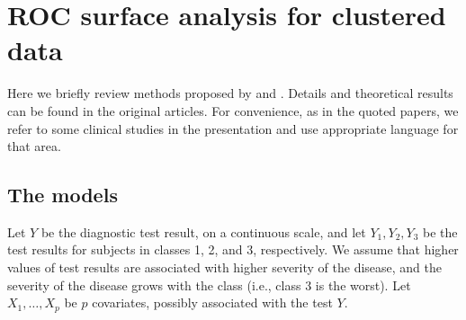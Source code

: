 \hypertarget{roc-surface-analysis-for-clustered-data}{%
\section{ROC surface analysis for clustered
data}\label{roc-surface-analysis-for-clustered-data}}

Here we briefly review methods proposed by \citet{xiong2018estimating} and \citet{khanh2022}. Details and theoretical results can be found in the original articles. {For convenience, as in the quoted papers, we refer to some clinical studies in the presentation and use appropriate language for that area.}

\hypertarget{the-models}{%
\subsection{The models}\label{the-models}}

Let $Y$ be the diagnostic test result, on a continuous scale, and let $Y_1, Y_2, Y_3$ be the test results for subjects in classes 1, 2, and 3, respectively. We assume that higher values of test results are associated with higher severity of the disease, and the severity of the disease grows with the class (i.e., class 3 is the worst). Let $X_1, \ldots, X_p$ be $p$ covariates, possibly associated with the test $Y$.

